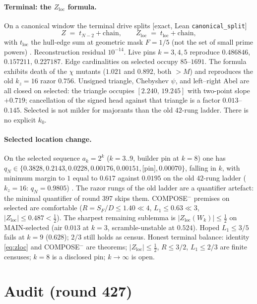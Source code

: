 \documentclass[11pt]{article}
\theoremstyle{remark}
\newcommand{\half}{\tfrac12}
\newcommand{\Zloc}{Z_{\mathrm{loc}}}
\newcommand{\gr}[1]{\textnormal{\small[#1]}}
\begin{document}
\paragraph{Terminal: the $\Zloc$ formula.}
On a canonical window the terminal drive splits
\gr{exact, Lean \texttt{canonical\_split}}
\begin{equation}\label{eq:zloc}
Z \;=\; t_{N-2}+\mathrm{chain},
\qquad
\Zloc \;=\; t_{\mathrm{loc}}+\mathrm{chain},
\end{equation}
with $t_{\mathrm{loc}}$ the hull-edge sum at geometric mask
$F=1/5$ (not the set of small prime powers)
\cite{zloc-head}.  Reconstruction
residual $10^{-14}$.  Live pins $k=3,4,5$ reproduce
$0.486846$, $0.157211$, $0.227187$.  Edge cardinalities on
selected occupy $85$--$1691$.  The formula exhibits death of
the $\chi$ mutants ($1.021$ and $0.892$, both $>M$) and
reproduces the old $k_{z}=16$ razor $0.756$.
Unsigned triangle, Chebyshev $\psi$, and left--right Abel are
all closed on selected: the triangle occupies
$[2.240,\,19.245]$ with two-point slope $+0.719$; cancellation
of the signed head against that triangle is a factor
$0.013$--$0.145$.  Selected is not milder for majorants than
the old $42$-rung ladder.  There is no explicit $k_{0}$.

\paragraph{Selected location change.}
On the selected sequence $a_{k}=2^{k}$ ($k=3..9$, builder pin
at $k=8$) one has
$q_{N}\in\{0.3828,0.2143,0.0228,0.00176,0.00151,\text{[pin]},0.00070\}$,
falling in $k$, with minimum margin to $1$ equal to $0.617$
against $0.0195$ on the old $42$-rung ladder
($k_{z}=16$: $q_{N}=0.9805$)
\cite{qn-reopened}.  The razor rungs of the old
ladder are a quantifier artefact: the minimal quantifier of
round 397 skips them.  COMPOSE$^{-}$ premises on selected are
comfortable ($R=S_{F}/D\le1.40\ll4$, $L_{1}\le0.63\ll3$,
$|\Zloc|\le0.487<\half$).  The sharpest remaining sublemma is
$|\Zloc(W_{k})|\le\half$ on MAIN-selected (air $0.013$ at
$k=3$, scramble-unstable at $0.524$).  Hoped $L_{1}\le3/5$
fails at $k=9$ ($0.628$); $2/3$ still holds as census.
Honest terminal balance: identity \eqref{eq:zloc} and
COMPOSE$^{-}$ are theorems; $|\Zloc|\le\half$, $R\le3/2$,
$L_{1}\le2/3$ are finite censuses; $k=8$ is a disclosed pin;
$k\to\infty$ is open.

\section{Audit (round 427)}\label{sec:audit}
\end{document}
